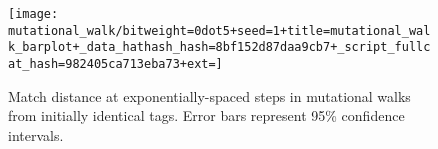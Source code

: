 \begin{figure}
\begin{center}

\texttt{[image: mutational\_walk/bitweight=0dot5+seed=1+title=mutational\_walk\_barplot+\_data\_hathash\_hash=8bf152d87daa9cb7+\_script\_fullcat\_hash=982405ca713eba73+ext=]}
\caption{
Match distance at exponentially-spaced steps in mutational walks from initially identical tags.
Error bars represent 95\% confidence intervals.
}
\label{fig:mutational_walk_barplot}

\end{center}
\end{figure}

